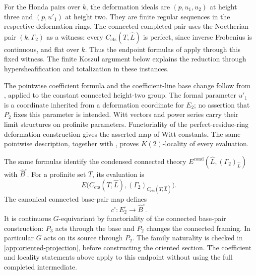 \documentclass[11pt]{article}
\numberwithin{equation}{section}
\theoremstyle{definition}
\theoremstyle{remark}
\begin{document}
For the Honda pairs over \(k\), the deformation ideals are
\((p,u_1,u_2)\) at height three and \((p,u'_1)\) at height two.
They are finite regular sequences in the respective deformation rings.
The connected completed pair uses the Noetherian pair
\((k,\Gamma_2)\) as a witness: every
\(C_{\mathrm{cts}}(T,\widehat L)\) is perfect, since inverse Frobenius is
continuous, and flat over \(k\). Thus the endpoint formulas of
\cite[Proposition~4.5.5]{BMR2026} apply through this fixed witness.
The finite Koszul argument below explains the reduction through
hypersheafification and totalization in these instances.

The pointwise coefficient formula and the coefficient-line base change
follow from \cite[Lemma 4.2.12 and Proposition 4.5.5]{BMR2026}, applied to
the constant connected height-two group.  The formal parameter $u'_1$
is a coordinate inherited from a deformation coordinate for $E_2$; no
assertion that $P_2$ fixes this parameter is intended.  Witt vectors and
power series carry their limit structures on profinite parameters.
Functoriality of the perfect-residue-ring deformation construction gives
the asserted map of Witt constants.  The same pointwise description,
together with \cite[Proposition 4.4.2]{BMR2026}, proves $K(2)$-locality
of every evaluation.

The same formulas identify the condensed connected theory
\(E^{\mathrm{cond}}(\widehat L,(\Gamma_2)_{\widehat L})\)
with \(\widehat B^\square\). For a profinite set \(T\), its evaluation is
\[
 E\bigl(C_{\mathrm{cts}}(T,\widehat L),
        (\Gamma_2)_{C_{\mathrm{cts}}(T,\widehat L)}\bigr).
\]
The canonical connected
base-pair map defines
\[
 c^\square:E_2^\square\longrightarrow\widehat B^\square.
\]
It is continuous \(G\)-equivariant by functoriality of the connected
base-pair construction: \(P_3\) acts through the base and \(P_2\)
changes the connected framing. In particular \(G\) acts on its
source through \(P_2\). The family naturality is checked in
\cref{app:oriented-projection}, before constructing the oriented section.
The coefficient and locality statements above apply to this endpoint
without using the full completed intermediate.
\end{document}
